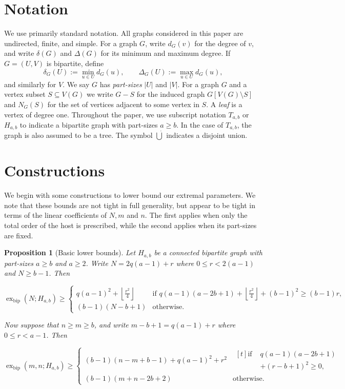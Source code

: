 \documentclass[10pt,a4paper]{amsart}
\newtheorem{proposition}[theorem]{Proposition}
\newcommand{\exbip}{\operatorname{ex}_{\mathrm{bip}}}
\begin{document}
\section{Notation}
\label{sec:notation}

We use primarily standard notation. All graphs considered in this paper are undirected, finite, and simple. For a graph $G$, write $d_G(v)$ for the degree of $v$, and write $\delta(G)$ and $\Delta(G)$ for its minimum and maximum degree. If $G=(U,V)$ is bipartite, define
\[
    \delta_G(U):=\min_{u\in U}d_G(u),
    \qquad
    \Delta_G(U):=\max_{u\in U}d_G(u),
\]
and similarly for $V$. We  say $G$ has \emph{part-sizes} $|U|$ and $|V|$. For a graph $G$ and a vertex subset $S\subseteq V(G)$ we write $G-S$ for the induced graph $G[V(G)\setminus S]$ and $N_G(S)$ for the set of vertices adjacent to some vertex in $S$. A \emph{leaf} is a vertex of degree one. Throughout the paper, we use subscript notation $T_{a,b}$ or $H_{a,b}$ to indicate a bipartite graph with part-sizes $a\geq b$. In the case of $T_{a,b}$, the graph is also assumed to be a tree. The symbol $\dot\bigcup$ indicates a disjoint union.
\section{Constructions}
\label{sec:constructions}

We begin with some constructions to lower bound our extremal parameters. We note that these bounds are not tight in full generality, but appear to be tight in terms of the linear coefficients of $N,m$ and $n$. The first applies when only the total order of the host is prescribed, while the second applies when its part-sizes are fixed.

\begin{proposition}[Basic lower bounds]
\label{prop:lower-bounds}
Let \(H_{a,b}\) be a connected bipartite graph with part-sizes \(a\geq b\) and \(a\geq2\). Write $N=2q(a-1)+r$ where $0\leq r<2(a-1)$ and $N\geq b-1$. Then

\[
\exbip(N;H_{a,b}) \geq
\begin{cases}
q(a-1)^2+\left\lfloor\frac{r^2}{4}\right\rfloor &\text{if } q(a-1)(a-2b+1)+\left\lfloor\frac{r^2}{4}\right\rfloor+(b-1)^2\geq (b-1)r,\\[3mm]
(b-1)(N-b+1)&\text{otherwise}.
\end{cases}
\]

\noindent Now suppose that \(n\geq m\geq b\), and write $m-b+1=q(a-1)+r$ where $0\leq r<a-1$. Then

\[
\exbip(m,n;H_{a,b})\ge
\begin{cases}
(b-1)(n-m+b-1)+q(a-1)^2+r^2
&
\begin{aligned}[t]
\text{if }&
q(a-1)(a-2b+1)\\
&+(r-b+1)^2\ge0,
\end{aligned}
\\[3mm]
(b-1)(m+n-2b+2)
&
\text{otherwise.}
\end{cases}
\]
\end{proposition}
\end{document}
